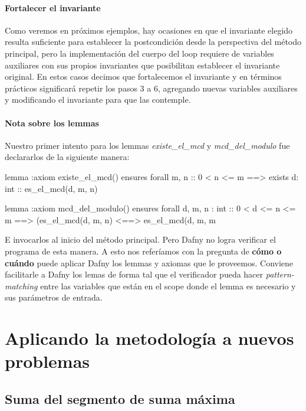 \documentclass[12pt, a4paper, openany, fleqn]{book}
\begin{document}

    \subsubsection{Fortalecer el invariante}
    Como veremos en próximos ejemplos, hay ocasiones en que el invariante elegido resulta suficiente para establecer la postcondición desde la perspectiva del método principal, pero la implementación del cuerpo del loop requiere de variables auxiliares con sus propios invariantes que posibilitan establecer el invariante original.
    En estos casos decimos que fortalecemos el invariante y en términos prácticos significará repetir los pasos 3 a 6, agregando nuevas variables auxiliares y modificando el invariante para que las contemple.

    \subsubsection{Nota sobre los lemmas}
    Nuestro primer intento para los lemmas \textit{existe\_el\_mcd} y \textit{mcd\_del\_modulo} fue declararlos de la siguiente manera:

    \begin{dafny}
lemma {:axiom} existe_el_mcd()
    ensures forall m, n :: 0 < n <= m ==>
        exists d: int :: es_el_mcd(d, m, n)

lemma {:axiom} mcd_del_modulo()
    ensures forall d, m, n : int :: 0 < d <= n <= m ==>
        (es_el_mcd(d, m, n) <==> es_el_mcd(d, m, m %
    \end{dafny}

    E invocarlos al inicio del método principal. Pero Dafny no logra verificar el programa de esta manera. A esto nos referíamos con la pregunta de \textbf{cómo o cuándo} puede aplicar Dafny los lemmas y axiomas que le proveemos. Conviene facilitarle a Dafny los lemas de forma tal que el verificador pueda hacer \textit{pattern-matching} entre las variables que están en el scope donde el lemma es necesario y sus parámetros de entrada.

    \chapter{Aplicando la metodología a nuevos problemas}

    \section{Suma del segmento de suma máxima}
\end{document}

